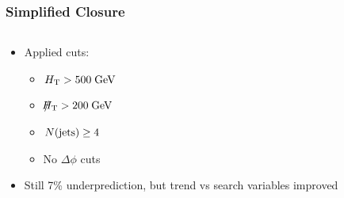 \documentclass{beamer}
\begin{document}
\begin{frame}
 \frametitle{Simplified Closure}
 \begin{columns}
  \begin{column}{0.33\textwidth}
  \begin{itemize}
   \item Applied cuts:
   \begin{itemize}
    \item $H_{\text{T}}>500\;\text{Ge}\kern-0.06667em\text{V}$
    \item $\slash\mkern-12mu{H}_{\text{T}}>200\;\text{Ge}\kern-0.06667em\text{V}$
    \item $N(\text{jets})\ge4$
    \item No $\Delta\phi$ cuts
   \end{itemize}
   \item Still 7\% underprediction, but trend vs search variables improved
  \end{itemize}
  \end{column}
  \begin{column}{0.33\textwidth}

\end{column}
\end{columns}
\end{frame}
\end{document}
